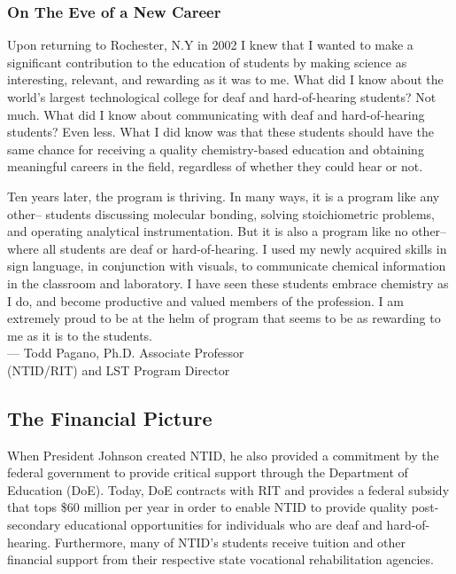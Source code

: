 \documentclass[11.5pt]{sig-alternate} %
\begin{document}
\begin{large}
\subsubsection*{On The Eve of a New Career}
Upon returning to Rochester, N.Y in 2002 I knew that I wanted to make a significant contribution to the education of students by making science as interesting, relevant, and rewarding as it was to me. What did I know about the world’s largest technological college for deaf and hard-of-hearing students? Not much. What did I know about communicating with deaf and hard-of-hearing students? Even less. What I did know was that these students should have the same chance for receiving a quality chemistry-based education and obtaining meaningful careers in the field, regardless of whether they could hear or not.

Ten years later, the program is thriving. In many ways, it is a program like any other– students discussing molecular bonding, solving stoichiometric problems, and operating analytical instrumentation. But it is also a program like no other– where all students are deaf or hard-of-hearing. I used my newly acquired skills in sign language, in conjunction with visuals, to communicate chemical information in the classroom and laboratory. I have seen these students embrace chemistry as I do, and become productive and valued members of the profession. I am extremely proud to be at the helm of program that seems to be as rewarding to me as it is to the students.
\\— Todd Pagano, Ph.D. Associate Professor \\(NTID/RIT) and LST Program Director

\subsection*{The Financial Picture}
When President Johnson created NTID, he also provided a commitment by the federal government to provide critical support through the Department of Education (DoE). Today, DoE contracts with RIT and provides a federal subsidy that tops \$60 million per year in order to enable NTID to provide quality post-secondary educational opportunities for individuals who are deaf and hard-of-hearing. Furthermore, many of NTID’s students receive tuition and other financial support from their respective state vocational rehabilitation agencies.


\end{large}
\end{document}
